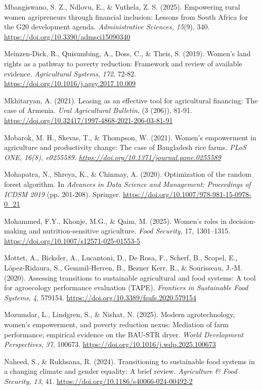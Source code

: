 \documentclass[
]{article}
\begin{document}
Mbangiswano, S. Z., Ndlovu, E., \& Vuthela, Z. S. (2025). Empowering
rural women agripreneurs through financial inclusion: Lessons from South
Africa for the G20 development agenda. \emph{Administrative Sciences,
15}(9), 340. \url{https://doi.org/10.3390/admsci15090340}

Meinzen-Dick, R., Quisumbing, A., Doss, C., \& Theis, S. (2019). Women's
land rights as a pathway to poverty reduction: Framework and review of
available evidence. \emph{Agricultural Systems}, \emph{172}, 72-82.
\url{https://doi.org/10.1016/j.agsy.2017.10.009}

Mkhitaryan, A. (2021). Leasing as an effective tool for agricultural
financing: The case of Armenia. \emph{Ural Agricultural Bulletin}, (3
(206)), 81-91.
\url{https://doi.org/10.32417/1997-4868-2021-206-03-81-91}

Mobarok, M. H., Skevas, T., \& Thompson, W. (2021). Women's empowerment
in agriculture and productivity change: The case of Bangladesh rice
farms. \emph{PLoS ONE, 16(8), e0255589.}
\href{https://doi.org/10.1371/journal.pone.0255589}{\emph{https://doi.org/10.1371/journal.pone.0255589}}

Mohapatra, N., Shreya, K., \& Chinmay, A. (2020). Optimization of the
random forest algorithm. In \emph{Advances in Data Science and
Management: Proceedings of ICDSM 2019} (pp. 201-208). Springer.
\url{https://doi.org/10.1007/978-981-15-0978-0_21}

Mohammed, F.Y., Khonje, M.G., \& Qaim, M. (2025). Women's roles in
decision-making and nutrition-sensitive agriculture. \emph{Food
Security,} 17, 1301--1315.
\url{https://doi.org/10.1007/s12571-025-01553-5}

Mottet, A., Bicksler, A., Lucantoni, D., De Rosa, F., Scherf, B.,
Scopel, E., López-Ridaura, S., Gemmil-Herren, B., Bezner Kerr, R., \&
Sourisseau, J.-M. (2020). Assessing transitions to sustainable
agricultural and food systems: A tool for agroecology performance
evaluation (TAPE). \emph{Frontiers in Sustainable Food Systems},
\emph{4}, 579154. \url{https://doi.org/10.3389/fsufs.2020.579154}

Mozumdar, L., Lindgren, S., \& Nishat, N. (2025). Modern agrotechnology,
women's empowerment, and poverty reduction nexus: Mediation of farm
performance; empirical evidence on the BAU-STR dryer. \emph{World
Development Perspectives}, \emph{37}, 100673.
\url{https://doi.org/10.1016/j.wdp.2025.100673}

Naheed, S., \& Rukhsana, R. (2024). Transitioning to sustainable food
systems in a changing climate and gender equality: A brief review.
\emph{Agriculture \& Food Security, 13}, 41.
\url{https://doi.org/10.1186/s40066-024-00492-2}
\end{document}
